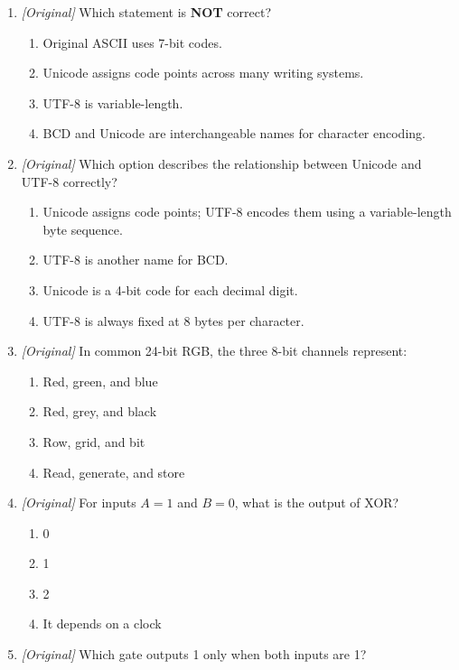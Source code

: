 \begin{enumerate}[label=\textbf{Q\arabic*.}, leftmargin=*]
\begin{enumerate}[label=\Alph*.]
    \item $0010\ 0101$
    \item $0101\ 0010$
    \item $11101_2$
  \end{enumerate}
\item \textit{[Original]} Which statement is \textbf{NOT} correct?
  \begin{enumerate}[label=\Alph*.]
    \item Original ASCII uses 7-bit codes.
    \item Unicode assigns code points across many writing systems.
    \item UTF-8 is variable-length.
    \item BCD and Unicode are interchangeable names for character encoding.
  \end{enumerate}
\item \textit{[Original]} Which option describes the relationship between
  Unicode and UTF-8 correctly?
  \begin{enumerate}[label=\Alph*.]
    \item Unicode assigns code points; UTF-8 encodes them using a
      variable-length byte sequence.
    \item UTF-8 is another name for BCD.
    \item Unicode is a 4-bit code for each decimal digit.
    \item UTF-8 is always fixed at 8 bytes per character.
  \end{enumerate}
\item \textit{[Original]} In common 24-bit RGB, the three 8-bit channels
  represent:
  \begin{enumerate}[label=\Alph*.]
    \item Red, green, and blue
    \item Red, grey, and black
    \item Row, grid, and bit
    \item Read, generate, and store
  \end{enumerate}
\item \textit{[Original]} For inputs $A=1$ and $B=0$, what is the output of
  XOR?
  \begin{enumerate}[label=\Alph*.]
    \item 0
    \item 1
    \item 2
    \item It depends on a clock
  \end{enumerate}
\item \textit{[Original]} Which gate outputs 1 only when both inputs are 1?

\end{enumerate}
